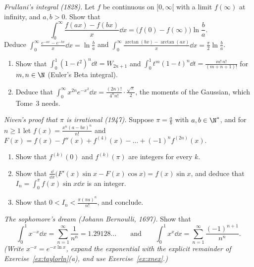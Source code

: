 \begin{exercise}[$\star\star$]\label{ex:frullani}
\emph{Frullani's integral (1828).} Let $f$ be continuous on $[0,\infty[$ with a limit $f(\infty)$ at infinity, and $a,b>0$. Show that
\[
\int_0^\infty\frac{f(ax)-f(bx)}x\dd x=\bigl(f(0)-f(\infty)\bigr)\ln\frac ba.
\]
Deduce $\int_0^\infty\frac{e^{-ax}-e^{-bx}}x\dd x=\ln\frac ba$ and $\int_0^\infty\frac{\arctan(bx)-\arctan(ax)}{x}\dd x=\frac\pi2\ln\frac ba$.
\end{exercise}

\begin{exercise}[$\star\star$]\label{ex:gammahalf}
\begin{enumerate}[label=(\alph*)]
\item Show that $\displaystyle\int_0^1(1-t^2)^n\dd t=W_{2n+1}$ and $\displaystyle\int_0^1t^{m}(1-t)^{n}\dd t=\frac{m!\,n!}{(m+n+1)!}$ for $m,n\in\N$ (Euler's Beta integral).
\item Deduce that $\displaystyle\int_0^\infty x^{2n}e^{-x^2}\dd x=\frac{(2n)!}{4^nn!}\cdot\frac{\sqrt\pi}2$, the moments of the Gaussian, which Tome~3 needs.
\end{enumerate}
\end{exercise}

\begin{exercise}[$\star\star\star$]\label{ex:niven}
\emph{Niven's proof that $\pi$ is irrational (1947).} Suppose $\pi=\frac ab$ with $a,b\in\N^*$, and for $n\ge1$ let $f(x)=\frac{x^n(a-bx)^n}{n!}$ and $F(x)=f(x)-f''(x)+f^{(4)}(x)-\dots+(-1)^nf^{(2n)}(x)$.
\begin{enumerate}[label=(\alph*)]
\item Show that $f^{(k)}(0)$ and $f^{(k)}(\pi)$ are integers for every $k$.
\item Show that $\frac{\dd}{\dd x}\bigl(F'(x)\sin x-F(x)\cos x\bigr)=f(x)\sin x$, and deduce that $I_n=\int_0^\pi f(x)\sin x\dd x$ is an integer.
\item Show that $0<I_n<\frac{\pi(\pi a)^n}{n!}$, and conclude.
\end{enumerate}
\end{exercise}

\begin{exercise}[$\star\star\star$]\label{ex:sophomore}
\emph{The sophomore's dream (Johann Bernoulli, 1697).} Show that
\[
\int_0^1x^{-x}\dd x=\sum_{n=1}^\infty\frac1{n^n}=1.29128\ldots\qquad\text{and}\qquad\int_0^1x^{x}\dd x=\sum_{n=1}^\infty\frac{(-1)^{n+1}}{n^n}.
\]
\emph{(Write $x^{-x}=e^{-x\ln x}$, expand the exponential with the explicit remainder of Exercise~\ref{ex:taylorln}(a), and use Exercise~\ref{ex:xnex}.)}
\end{exercise}

